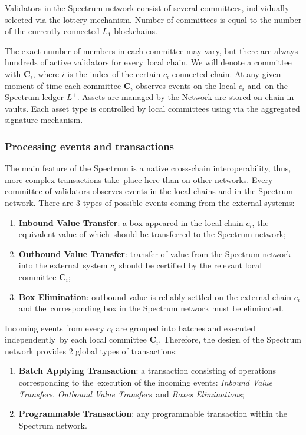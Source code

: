 Validators in the Spectrum network consist of several committees, individually selected via the lottery mechanism.
Number of committees is equal to the number of the currently connected $L_1$ blockchains.

The exact number of members in each committee may vary, but there are always hundreds of active validators for every\
local chain.
We will denote a committee with $\mathbf{C}_i$, where $i$ is the index of the certain $c_i$ connected chain.
At any given moment of time each committee $\mathbf{C}_i$ observes events on the local $c_i$ and\
on the Spectrum ledger $L^+$.
Assets are managed by the Network are stored on-chain in vaults.
Each asset type is controlled by local committees using via the aggregated signature mechanism.

\subsubsection{Processing events and transactions}

The main feature of the Spectrum is a native cross-chain interoperability, thus, more complex transactions take\
place here than on other networks.
Every committee of validators observes events in the local chains and in the Spectrum network.
There are 3 types of possible events coming from the external systems:
\begin{enumerate}
    \item \textbf{Inbound Value Transfer}: a box appeared in the local chain $c_i$, the equivalent value of which\
    should be transferred to the Spectrum network;
    \item \textbf{Outbound Value Transfer}: transfer of value from the Spectrum network into the external\
    system $c_i$ should be certified by the relevant local committee $\mathbf{C}_i$;
    \item \textbf{Box Elimination}: outbound value is reliably settled on the external chain $c_i$ and the\
    corresponding box in the Spectrum network must be eliminated.
\end{enumerate}

Incoming events from every $c_i$ are grouped into batches and executed independently\
by each local committee $\mathbf{C}_i$.
Therefore, the design of the Spectrum network provides 2 global types of transactions:
\begin{enumerate}
    \item \textbf{Batch Applying Transaction}: a transaction consisting of operations corresponding to the\
    execution of the incoming events: \textit{Inbound Value Transfers}, \textit{Outbound Value Transfers}\
    and \textit{Boxes Eliminations};
    \item \textbf{Programmable Transaction}: any programmable transaction within the Spectrum network.
\end{enumerate}

